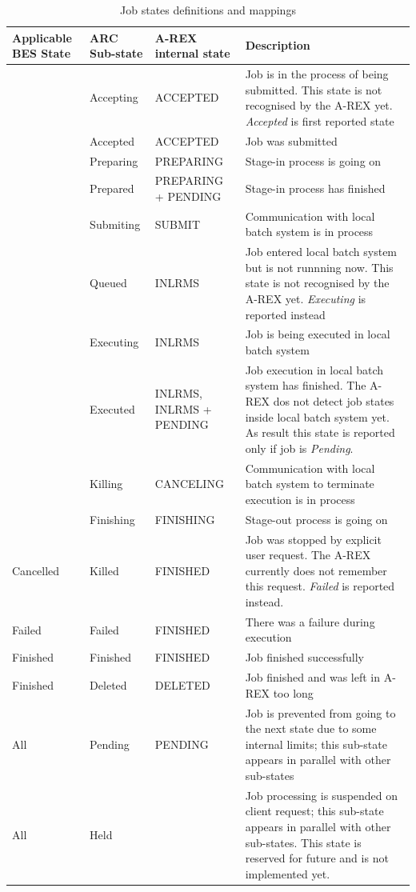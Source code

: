 \documentclass{article}                            %
\begin{document}
%
\begin{table}

\caption{\label{tab:Job-states-definitions}Job states definitions and mappings}

\begin{tabular}{|>{\centering}p{}|>{\centering}p{}|>{\centering}p{}|p{}|}
\hline 
Applicable BES State&
ARC Sub-state&
A-REX internal state&
Description\tabularnewline
\hline
\hline 
\multirow{2}{*}{Pending}& Accepting& ACCEPTED &
Job is in the process of being submitted. This state is not recognised
by the A-REX yet. \emph{Accepted} is first reported state\\ \cline{2-4}
&Accepted& ACCEPTED& Job was submitted\\ \hline 
\multirow{8}{*}{Running}& Preparing& PREPARING& Stage-in process is going on\\ \cline{2-4} 
&Prepared& PREPARING + PENDING& Stage-in process has finished\\ \cline{2-4} 
&Submiting& SUBMIT& Communication with local batch system is in process\\ \cline{2-4} 
&Queued& INLRMS&
Job entered local batch system but is not runnning now. This state
is not recognised by the A-REX yet. \emph{Executing} is reported instead\\ \cline{2-4} 
&Executing& INLRMS& Job is being executed in local batch system\\ \cline{2-4} 
&Executed& INLRMS, INLRMS + PENDING&
Job execution in local batch system has finished. The A-REX dos not
detect job states inside local batch system yet. As result this state
is reported only if job is \emph{Pending}.\\ \cline{2-4} 
&Killing& CANCELING& Communication with local batch system to terminate execution is in process\\ \cline{2-4} 
&Finishing& FINISHING& Stage-out process is going on\\ \hline 
Cancelled& Killed& FINISHED&
Job was stopped by explicit user request. The A-REX currently does
not remember this request. \emph{Failed} is reported instead.\\ \hline 
Failed& Failed& FINISHED& There was a failure during execution\\ \hline 
Finished& Finished& FINISHED& Job finished successfully\\ \hline 
Finished& Deleted& DELETED& Job finished and was left in A-REX too long\\ \hline 
All& Pending& PENDING&
Job is prevented from going to the next state due to some internal
limits; this sub-state appears in parallel with other sub-states\\ \hline 
All& Held& &
Job processing is suspended on client request; this sub-state appears
in parallel with other sub-states. This state is reserved for future
and is not implemented yet.\\ \hline
\end{tabular}
\end{table}
\end{document}
